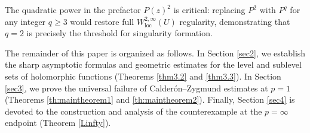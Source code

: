 \documentclass[12pt,twoside]{amsart}
\numberwithin{equation}{section}
\newtheorem{theorem}{Theorem}[section]
\numberwithin{definition}{section} %
\begin{document}
The quadratic power in the prefactor $P(z)^2$ is critical: replacing $P^2$ with $P^q$ for any integer $q \ge 3$ would restore full $W^{2,\infty}_{\mathrm{loc}}(U)$ regularity, demonstrating that $q = 2$ is precisely the threshold for singularity formation.

\medskip
The remainder of this paper is organized as follows. In Section \ref{sec2}, we establish the sharp asymptotic formulas and geometric estimates for the level and sublevel sets of holomorphic functions (Theorems \ref{thm3.2} and \ref{thm3.3}). In Section \ref{sec3}, we prove the universal failure of Calder\'on--Zygmund estimates at $p = 1$ (Theorems \ref{th:maintheorem1} and \ref{th:maintheorem2}). Finally, Section \ref{sec4} is devoted to the construction and analysis of the counterexample at the $p = \infty$ endpoint (Theorem \ref{Linfty}).




			
\end{document}
